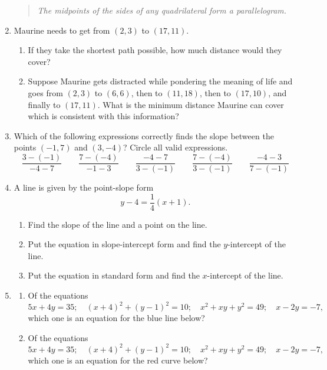 \begin{enumerate}
\begin{quote}
\textit{The midpoints of the sides of any quadrilateral form a parallelogram.}
\end{quote}
\item Maurine needs to get from $(2,3)$ to $(17,11)$.
\begin{enumerate}
\item If they take the shortest path possible, how much distance would they cover?
\item Suppose Maurine gets distracted while pondering the meaning of life and goes from $(2,3)$ to $(6,6)$, then to $(11, 18)$, then to $(17,10)$, and finally to $(17,11)$. What is the minimum distance Maurine can cover which is consistent with this information? 
\end{enumerate}
\item Which of the following expressions correctly finds the slope between the points $(-1,7)$ and $(3,-4)$? Circle all valid expressions.
\begin{equation*}
\frac{3 - (-1)}{-4 - 7}\qquad\frac{7 - (-4)}{-1 - 3}\qquad\frac{-4 - 7}{3 - (-1)}\qquad\frac{7 - (-4)}{3 - (-1)}\qquad\frac{-4 - 3}{7 - (-1)}
\end{equation*}
\item A line is given by the point-slope form
\begin{equation*}
y - 4 = \frac{1}{4}(x + 1).
\end{equation*}
\begin{enumerate}
\item Find the slope of the line and a point on the line.
\item Put the equation in slope-intercept form and find the $y$-intercept of the line.
\item Put the equation in standard form and find the $x$-intercept of the line.
\end{enumerate}
\item \begin{enumerate}
\item Of the equations
\begin{equation*}
5x + 4y = 35;\quad (x + 4)^2 + (y - 1)^2 = 10;\quad x^2 + xy + y^2 = 49;\quad x - 2y = -7,
\end{equation*}
which one is an equation for the blue line below?
\item Of the equations
\begin{equation*}
5x + 4y = 35;\quad (x + 4)^2 + (y - 1)^2 = 10;\quad x^2 + xy + y^2 = 49;\quad x - 2y = -7,
\end{equation*}
which one is an equation for the red curve below?

\end{enumerate}
\end{enumerate}
